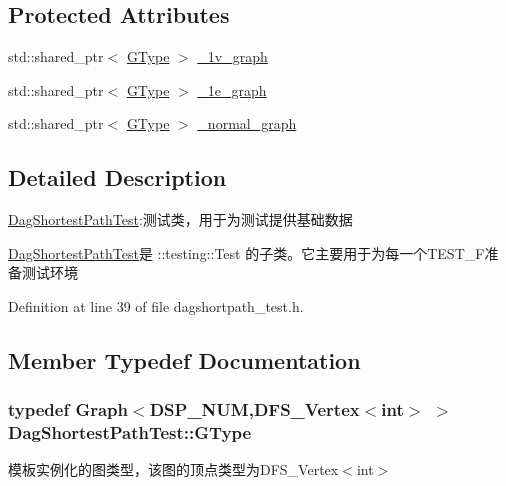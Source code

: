 \subsection*{Protected Attributes}
\begin{DoxyCompactItemize}
\item 
std\+::shared\+\_\+ptr$<$ \hyperlink{class_dag_shortest_path_test_a55e732c7641684c040cf6a6a2a836efe}{G\+Type} $>$ \hyperlink{class_dag_shortest_path_test_a6d07675b5b9714443bdcb1d7da426624}{\+\_\+1v\+\_\+graph}
\item 
std\+::shared\+\_\+ptr$<$ \hyperlink{class_dag_shortest_path_test_a55e732c7641684c040cf6a6a2a836efe}{G\+Type} $>$ \hyperlink{class_dag_shortest_path_test_a63cb4f638b9be6c6f0647775fd2b3419}{\+\_\+1e\+\_\+graph}
\item 
std\+::shared\+\_\+ptr$<$ \hyperlink{class_dag_shortest_path_test_a55e732c7641684c040cf6a6a2a836efe}{G\+Type} $>$ \hyperlink{class_dag_shortest_path_test_ac96676722661c8d7ad6baf5bd4dbf3a7}{\+\_\+normal\+\_\+graph}
\end{DoxyCompactItemize}


\subsection{Detailed Description}
\hyperlink{class_dag_shortest_path_test}{Dag\+Shortest\+Path\+Test}\+:测试类，用于为测试提供基础数据 

{\ttfamily \hyperlink{class_dag_shortest_path_test}{Dag\+Shortest\+Path\+Test}}是 {\ttfamily \+::testing\+::\+Test} 的子类。它主要用于为每一个{\ttfamily T\+E\+S\+T\+\_\+\+F}准备测试环境 

Definition at line 39 of file dagshortpath\+\_\+test.\+h.



\subsection{Member Typedef Documentation}
\hypertarget{class_dag_shortest_path_test_a55e732c7641684c040cf6a6a2a836efe}{}
\subsubsection[{G\+Type}]{\setlength{\rightskip}{0pt plus 5cm}typedef {\bf Graph}$<$D\+S\+P\+\_\+\+N\+U\+M,{\bf D\+F\+S\+\_\+\+Vertex}$<$int$>$ $>$ {\bf Dag\+Shortest\+Path\+Test\+::\+G\+Type}}\label{class_dag_shortest_path_test_a55e732c7641684c040cf6a6a2a836efe}
模板实例化的图类型，该图的顶点类型为{\ttfamily D\+F\+S\+\_\+\+Vertex$<$int$>$} 

